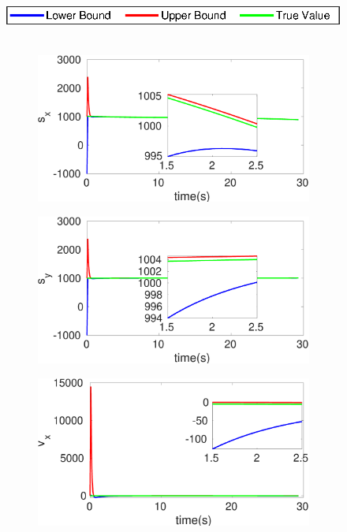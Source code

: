 \begin{figure}[!h]
\hspace*{\fill} \includegraphics[scale=0.8]{figures/legend}\\\\
\begin{subfigure}{.5\linewidth}
\centering
\includegraphics[width=\linewidth]{figures/HInf/s3caHInfs_x}
\end{subfigure}
\begin{subfigure}{.5\linewidth}
\centering
\includegraphics[width=\linewidth]{figures/HInf/s3caHInfs_y}
\end{subfigure}
\begin{subfigure}{.5\linewidth}
\centering
\includegraphics[width=\linewidth]{figures/HInf/s3caHInfv_x}

\end{subfigure}
\end{figure}
